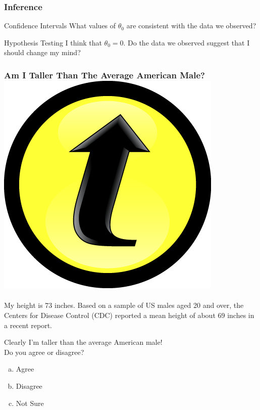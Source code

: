 \documentclass[handout]{beamer}
\begin{document}
\begin{frame}
\frametitle{Inference}

\begin{block}{Confidence Intervals}
What values of $\theta_0$ are consistent with the data we observed?
\end{block}

\begin{block}{Hypothesis Testing}
I think that $\theta_0 = 0$. Do the data we observed suggest that I should change my mind?
\end{block}


\end{frame}
\begin{frame}
\frametitle{Am I Taller Than The Average American Male? \hfill \includegraphics[scale = 0.05]{./images/clicker}}

\framesubtitle{\href{http://www.cdc.gov/nchs/data/series/sr_11/sr11_252.pdf}{}}

My height is 73 inches. Based on a sample of US males aged 20 and over, the Centers for Disease Control (CDC) reported a mean height of about 69 inches in a recent report.

\vspace{2em}



\alert{Clearly I'm taller than the average American male!}\\
Do you agree or disagree?
\begin{enumerate}[(a)]
	\item Agree
	\item Disagree
	\item Not Sure
\end{enumerate}
\end{frame}
\end{document}
